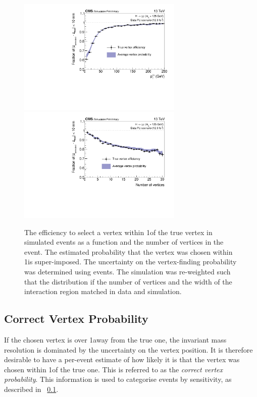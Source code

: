 \begin{figure}[h]
\centering
\includegraphics[width=0.7\textwidth]{recoFigures/Pt2016PU125BSReweighted12.pdf}
\includegraphics[width=0.7\textwidth]{recoFigures/Nvtx2016PU125BSReweighted12.pdf}
\caption{The efficiency to select a vertex within 1\cm of the true vertex in simulated \Hgg events as a function \pT and the number of vertices in the event. The estimated probability that the vertex was chosen within 1\cm is super-imposed. The uncertainty on the vertex-finding probability was determined using \Zmumu events. The simulation was re-weighted such that the distribution if the number of vertices and the width of the interaction region matched in data and simulation. }
\label{fig:reco:vtxidbdt_eff}
\end{figure}

\subsection{Correct Vertex Probability}

If the chosen vertex is over 1\cm away from the true one, the invariant mass resolution is dominated by the uncertainty on the vertex position. It is therefore desirable to have a per-event estimate of how likely it is that the vertex was chosen within 1\cm of the true one. This is referred to as the \emph{correct vertex probability}. This information is used to categorise events by sensitivity, as described in \Sec~\ref{}.

